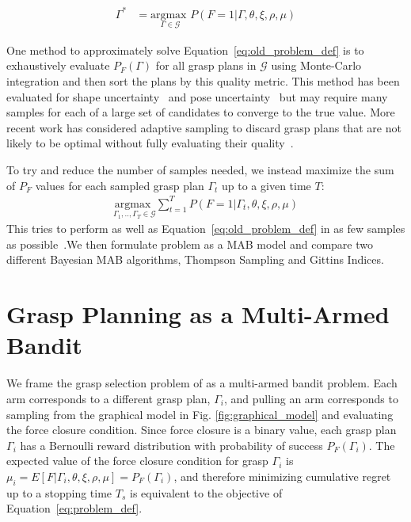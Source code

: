\documentclass[10pt, conference]{ieeeconf}      %
\newcommand{\mG}{\mathcal{G}}
\begin{document}
\vspace{-2ex}
\begin{align}
\Gamma^* &= \underset{\Gamma \in \mG}{\text{argmax }} P\left( F = 1 | \Gamma, \theta, \xi, \rho, \mu \right) \label{eq:old_problem_def}
\end{align}



One method to approximately solve Equation~\ref{eq:old_problem_def} is to exhaustively evaluate $P_F(\Gamma)$ for all grasp plans in $\mG$ using Monte-Carlo integration and then sort the plans by this quality metric.
This method has been evaluated for shape uncertainty~\cite{christopoulos2007handling, kehoe2012estimating} and pose uncertainty~\cite{weisz2012pose} but may require many samples for each of a large set of candidates to converge to the true value.
More recent work has considered adaptive sampling to discard grasp plans that are not likely to be optimal without fully evaluating their quality~\cite{kehoe2012toward}.

To try and reduce the number of samples needed, we instead maximize the sum of $P_F$ values for each sampled grasp plan $\Gamma_t$ up to a given time $T$:
\begin{align}
    \underset{\Gamma_1, .., \Gamma_T \in \mG}{\text{argmax }} \sum \limits_{t=1}^T P\left( F = 1 | \Gamma_t, \theta, \xi, \rho, \mu \right)   \label{eq:problem_def}
\end{align}
\noindent This tries to perform as well as Equation~\ref{eq:old_problem_def} in as few samples as possible~\cite{srinivas2009gaussian}.We then formulate  problem as a MAB model and compare two different Bayesian MAB algorithms, Thompson Sampling and Gittins Indices.

\section{Grasp Planning as a Multi-Armed Bandit}
We frame the grasp selection problem of  as a multi-armed bandit problem.
Each arm corresponds to a different grasp plan, $\Gamma_i$, and pulling an arm corresponds to sampling from the graphical model in Fig. \ref{fig:graphical_model} and evaluating the force closure condition.
Since force closure is a binary value, each grasp plan $\Gamma_i$ has a Bernoulli reward distribution with probability of success $P_F(\Gamma_i)$.
The expected value of the force closure condition for grasp $\Gamma_i$ is $\mu_i = E \left[ F | \Gamma_i, \theta, \xi, \rho, \mu \right] = P_F(\Gamma_i)$, and therefore minimizing cumulative regret up to a stopping time $T_s$ is equivalent to the objective of Equation~\ref{eq:problem_def}.
\end{document}
